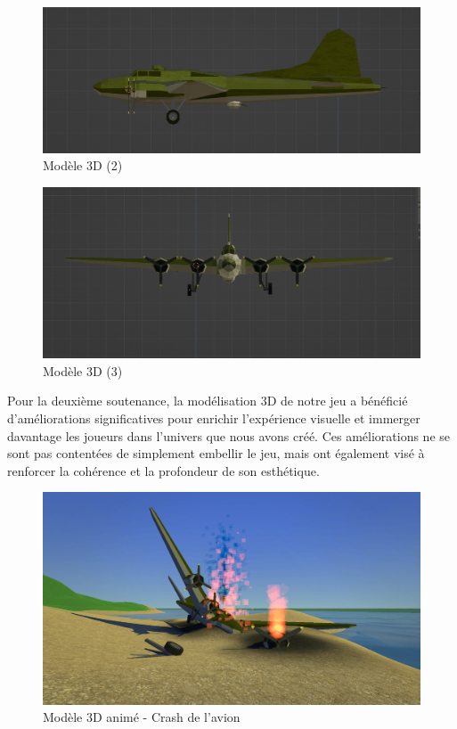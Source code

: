 \documentclass[
	article,			%
	11pt,				%
	oneside,			%
	a4paper,			%
	chapter=TITLE,
	french,			%
	sumario=tradicional
	]{base_nt}
\begin{document}
\begin{figure}[ht]
	\caption{Modèle 3D (2)}
	\centering
	\includegraphics[width=1\linewidth]{paper5.png}
	\legend{}
	
\end{figure}
\begin{figure}[ht]
	\caption{Modèle 3D (3)}
	\centering
	\includegraphics[width=1\linewidth]{paper6.png}
	\legend{}
	
\end{figure}

\newpage

Pour la deuxième soutenance, la modélisation 3D de notre jeu a bénéficié d'améliorations significatives pour enrichir l'expérience visuelle et immerger davantage les joueurs dans l'univers que nous avons créé. Ces améliorations ne se sont pas contentées de simplement embellir le jeu, mais ont également visé à renforcer la cohérence et la profondeur de son esthétique.

\begin{figure}[ht]
	\caption{Modèle 3D animé - Crash de l'avion}
	\centering
	\includegraphics[width=1\linewidth]{paper20.png}
	\legend{}
	
\end{figure}
\end{document}
